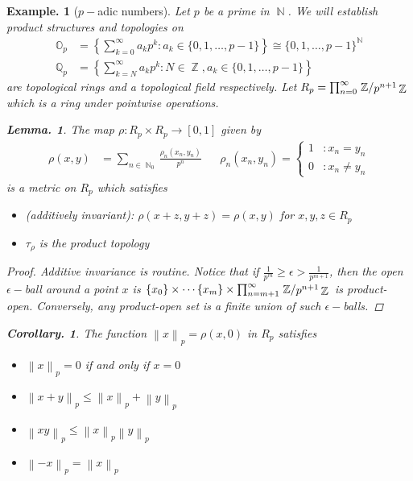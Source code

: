 \documentclass[11pt, a4paper]{memoir}
\DeclareMathOperator{\N}{{\mathbb{N}}}
\DeclareMathOperator{\Z}{{\mathbb{Z}}}
\newcommand{\norm}[1]{\ensuremath{\left\lVert#1\right\rVert}}
\theoremstyle{change}
\newtheorem{lemma}[theorem]{Lemma.}
\newtheorem{corollary}[theorem]{Corollary.}
\theoremstyle{plain}
\theoremstyle{nonumberplain}
\newtheorem{example}{Example.}
\newtheorem{proof}{Proof}
\newcommand{\quot}[2]{\mathchoice{\left.\raisebox{0.14em}{$#1$}\middle/\raisebox{-0.14em}{$#2$}\right.}
                                 {\left.\raisebox{0.08em}{$#1$}\middle/\raisebox{-0.08em}{$#2$}\right.}
                                 {\left.\raisebox{0.03em}{$#1$}\middle/\raisebox{-0.03em}{$#2$}\right.}
                                 {\left.\raisebox{0em}{$#1$}\middle/\raisebox{0em}{$#2$}\right.}}
\newcommand{\defname}[1]{{\textit{(#1)}:}}
\numberwithin{equation}{section}
\begin{document}
\begin{example}[$p-$adic numbers]
    Let $p$ be a prime in $\N$.
    We will establish product structures and topologies on
    \begin{align*}
        \mathbb{O}_p&=\left\{\sum_{k=0}^\infty a_kp^k:a_k\in\{0,1,\ldots,p-1\}\right\}\cong\{0,1,\ldots,p-1\}^{\N}\\
        \mathbb{Q}_p&=\left\{\sum_{k=N}^\infty a_kp^k:N\in\Z, a_k\in\{0,1,\ldots,p-1\}\right\}
    \end{align*}
    are topological rings and a topological field respectively.
    Let $R_p=\prod_{n=0}^\infty\quot{\Z}{p^{n+1}\Z}$ which is a ring under pointwise operations.
    \begin{lemma}
        The map $\rho:R_p\times R_p\to[0,1]$ given by
        \begin{align*}
            \rho(x,y)&=\sum_{n\in\N_0}\frac{\rho_n(x_n,y_n)}{p^n} & &\rho_n(x_n,y_n)=\begin{cases}1 &:x_n=y_n\\ 0 &:x_n\neq y_n\end{cases}
        \end{align*}
        is a metric on $R_p$ which satisfies
        \begin{itemize}[nl]
            \item \defname{additively invariant}
                $\rho(x+z,y+z)=\rho(x,y)$ for $x,y,z\in R_p$
            \item $\tau_\rho$ is the product topology
        \end{itemize}
    \end{lemma}
    \begin{proof}
        Additive invariance is routine.
        Notice that if $\frac{1}{p^m}\geq\epsilon>\frac{1}{p^{m+1}}$, then the open $\epsilon-$ball around a point $x$ is $\{x_0\}\times\cdots\{x_m\}\times\prod_{n=m+1}^\infty\quot{\Z}{p^{n+1}\Z}$ is product-open.
        Conversely, any product-open set is a finite union of such $\epsilon-$balls.
    \end{proof}
    \begin{corollary}
        The function $\norm{x}_p=\rho(x,0)$ in $R_p$ satisfies
        \begin{itemize}[nl]
            \item $\norm{x}_p=0$ if and only if $x=0$
            \item $\norm{x+y}_p\leq\norm{x}_p+\norm{y}_p$
            \item $\norm{xy}_p\leq\norm{x}_p\norm{y}_p$
            \item $\norm{-x}_p=\norm{x}_p$

\end{itemize}
\end{corollary}
\end{example}
\end{document}
